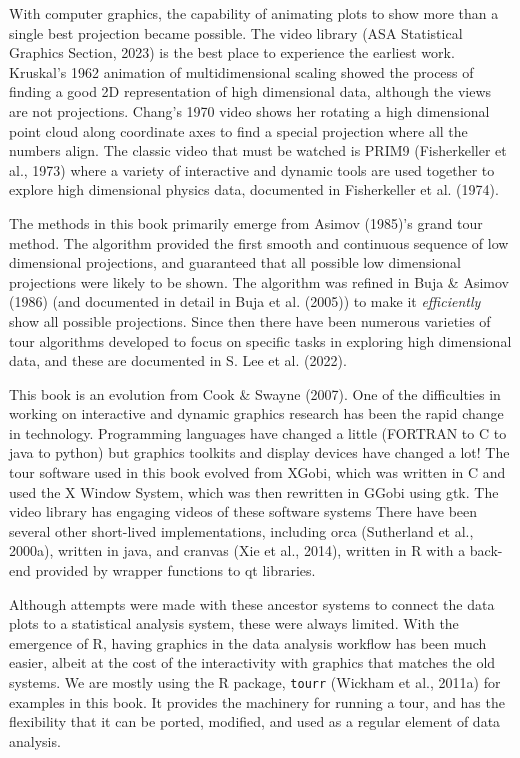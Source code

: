 \documentclass[
  letterpaper,
]{krantz}
\begin{document}
With computer graphics, the capability of animating plots to show more
than a single best projection became possible. The video library (ASA
Statistical Graphics Section, 2023) is the best place to experience the
earliest work. Kruskal's 1962 animation of multidimensional scaling
showed the process of finding a good 2D representation of high
dimensional data, although the views are not projections. Chang's 1970
video shows her rotating a high dimensional point cloud along coordinate
axes to find a special projection where all the numbers align. The
classic video that must be watched is PRIM9 (Fisherkeller et al., 1973)
where a variety of interactive and dynamic tools are used together to
explore high dimensional physics data, documented in Fisherkeller et al.
(1974).

The methods in this book primarily emerge from Asimov (1985)'s grand
tour method. The algorithm provided the first smooth and continuous
sequence of low dimensional projections, and guaranteed that all
possible low dimensional projections were likely to be shown. The
algorithm was refined in Buja \& Asimov (1986) (and documented in detail
in Buja et al. (2005)) to make it \emph{efficiently} show all possible
projections. Since then there have been numerous varieties of tour
algorithms developed to focus on specific tasks in exploring high
dimensional data, and these are documented in S. Lee et al. (2022).

This book is an evolution from Cook \& Swayne (2007). One of the
difficulties in working on interactive and dynamic graphics research has
been the rapid change in technology. Programming languages have changed
a little (FORTRAN to C to java to python) but graphics toolkits and
display devices have changed a lot! The tour software used in this book
evolved from XGobi, which was written in C and used the X Window System,
which was then rewritten in GGobi using gtk. The video library has
engaging videos of these software systems There have been several other
short-lived implementations, including orca (Sutherland et al., 2000a),
written in java, and cranvas (Xie et al., 2014), written in R with a
back-end provided by wrapper functions to qt libraries.

Although attempts were made with these ancestor systems to connect the
data plots to a statistical analysis system, these were always limited.
With the emergence of R, having graphics in the data analysis workflow
has been much easier, albeit at the cost of the interactivity with
graphics that matches the old systems. We are mostly using the R
package, \texttt{tourr} (Wickham et al., 2011a) for examples in this
book. It provides the machinery for running a tour, and has the
flexibility that it can be ported, modified, and used as a regular
element of data analysis.
\end{document}
